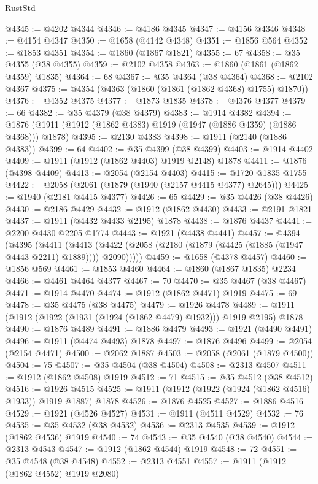 \begin{lexlean}{RustStd}
\begin{coremodule}
@4345 := @4202 @4344
@4346 := @4186 @4345
@4347 := @4156 @4346
@4348 := @4154 @4347
@4350 := @1658 (@4142 @4348)
@4351 := @1856 @564
@4352 := @1853 @4351
@4354 := @1860 (@1867 @1821)
@4355 := 67
@4358 := @35 @4355 (@38 @4355)
@4359 := @2102 @4358
@4363 := @1860 (@1861 (@1862 @4359) @1835)
@4364 := 68
@4367 := @35 @4364 (@38 @4364)
@4368 := @2102 @4367
@4375 := @4354 (@4363 (@1860 (@1861 (@1862 @4368) @1755) @1870))
@4376 := @4352 @4375
@4377 := @1873 @1835
@4378 := @4376 @4377
@4379 := 66
@4382 := @35 @4379 (@38 @4379)
@4383 := @1914 @4382
@4394 := @1876 (@1911 (@1912 (@1862 @4383) @1919 (@1947 (@1886 @4359) (@1886 @4368))) @1878)
@4395 := @2130 @4383
@4398 := @1911 (@2140 (@1886 @4383))
@4399 := 64
@4402 := @35 @4399 (@38 @4399)
@4403 := @1914 @4402
@4409 := @1911 (@1912 (@1862 @4403) @1919 @2148) @1878
@4411 := @1876 (@4398 @4409)
@4413 := @2054 (@2154 @4403)
@4415 := @1720 @1835 @1755
@4422 := @2058 (@2061 (@1879 (@1940 (@2157 @4415 @4377) @2645)))
@4425 := @1940 (@2181 @4415 @4377)
@4426 := 65
@4429 := @35 @4426 (@38 @4426)
@4430 := @2186 @4429
@4432 := @1912 (@1862 @4430)
@4433 := @2191 @1821
@4437 := @1911 (@4432 @4433 @2195) @1878
@4438 := @1876 @4437
@4441 := @2200 @4430 @2205 @1774
@4443 := @1921 (@4438 @4441)
@4457 := @4394
    (@4395
      (@4411
        (@4413 (@4422 (@2058 (@2180 (@1879 (@4425 (@1885 (@1947 @4443 @2211) @1889)))) @2090)))))
@4459 := @1658 (@4378 @4457)
@4460 := @1856 @569
@4461 := @1853 @4460
@4464 := @1860 (@1867 @1835) @2234
@4466 := @4461 @4464 @4377
@4467 := 70
@4470 := @35 @4467 (@38 @4467)
@4471 := @1914 @4470
@4474 := @1912 (@1862 @4471) @1919
@4475 := 69
@4478 := @35 @4475 (@38 @4475)
@4479 := @1926 @4478
@4489 := @1911 (@1912 (@1922 (@1931 (@1924 (@1862 @4479) @1932))) @1919 @2195) @1878
@4490 := @1876 @4489
@4491 := @1886 @4479
@4493 := @1921 (@4490 @4491)
@4496 := @1911 (@4474 @4493) @1878
@4497 := @1876 @4496
@4499 := @2054 (@2154 @4471)
@4500 := @2062 @1887
@4503 := @2058 (@2061 (@1879 @4500))
@4504 := 75
@4507 := @35 @4504 (@38 @4504)
@4508 := @2313 @4507
@4511 := @1912 (@1862 @4508) @1919
@4512 := 71
@4515 := @35 @4512 (@38 @4512)
@4516 := @1926 @4515
@4525 := @1911 (@1912 (@1922 (@1924 (@1862 @4516) @1933)) @1919 @1887) @1878
@4526 := @1876 @4525
@4527 := @1886 @4516
@4529 := @1921 (@4526 @4527)
@4531 := @1911 (@4511 @4529)
@4532 := 76
@4535 := @35 @4532 (@38 @4532)
@4536 := @2313 @4535
@4539 := @1912 (@1862 @4536) @1919
@4540 := 74
@4543 := @35 @4540 (@38 @4540)
@4544 := @2313 @4543
@4547 := @1912 (@1862 @4544) @1919
@4548 := 72
@4551 := @35 @4548 (@38 @4548)
@4552 := @2313 @4551
@4557 := @1911 (@1912 (@1862 @4552) @1919 @2080)

\end{coremodule}
\end{lexlean}
